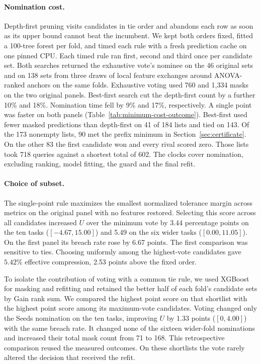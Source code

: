 \paragraph{Nomination cost.}
Depth-first pruning visits candidates in tie order and abandons each row as soon
as its upper bound cannot beat the incumbent. We kept both orders fixed, fitted a 100-tree forest per fold,
and timed each rule with a fresh prediction cache on one pinned CPU.
Each timed rule ran first, second and third once per candidate set. Both searches returned the
exhaustive vote's nominee on the 46 original sets and on 138 sets from
three draws of local feature exchanges around ANOVA-ranked anchors on the same folds. Exhaustive voting used 760
and 1,334 masks on the two original panels. Best-first search cut the
depth-first count by a further 10\% and 18\%. Nomination time fell by 9\%
and 17\%, respectively. A single point was faster on both panels
(Table~\ref{tab:minimum-cost-outcome}).
Best-first used fewer masked predictions than depth-first on 41 of 184 lists and tied
on 143. Of the 173 nonempty lists, 90 met the prefix minimum in Section~\ref{sec:certificate}.
On the other 83 the first candidate won and every rival scored zero. Those lists took
718 queries against a shortest total of 602. The clocks cover nomination, excluding ranking, model fitting,
the guard and the final refit.

\paragraph{Choice of subset.}
The single-point rule maximizes the smallest normalized tolerance margin
across metrics on the original panel with no features restored.
Selecting this score across all candidates increased
\(U\) over the minimum vote by 3.44 percentage points on the ten tasks
(\([-4.67,15.00]\)) and 5.49 on the six wider tasks (\([0.00,11.05]\)).
On the first panel its breach rate rose by 6.67 points. The first comparison
was sensitive to ties. Choosing uniformly among the highest-vote candidates
gave \(5.42\%\) effective compression, 2.53 points above the fixed order.

To isolate the contribution of voting with a common tie rule, we used
XGBoost for masking and refitting and retained the better half of each
fold's candidate sets by Gain rank sum. We compared the highest point
score on that shortlist with the highest point score among its
maximum-vote candidates. Voting changed only the Seeds nomination on
the ten tasks, improving \(U\) by 1.33 points (\([0,4.00]\)) with the
same breach rate. It changed none of the sixteen wider-fold nominations
and increased their total mask count from 71 to 168. This retrospective
comparison reused the measured outcomes. On these shortlists the vote
rarely altered the decision that received the refit.
